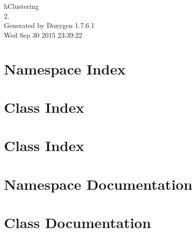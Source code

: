 \documentclass[a4paper]{book}
\begin{document}
\hypersetup{pageanchor=false,citecolor=blue}
\begin{titlepage}
\vspace*{7cm}
\begin{center}
{\Large h\-Clustering \\[1ex]\large 2. }\\
\vspace*{1cm}
{\large \-Generated by Doxygen 1.7.6.1}\\
\vspace*{0.5cm}
{\small Wed Sep 30 2015 23:39:22}\\
\end{center}
\end{titlepage}
\clearemptydoublepage
{}
\tableofcontents
\clearemptydoublepage
{}
\hypersetup{pageanchor=true,citecolor=blue}
\chapter{\-Namespace \-Index}

\chapter{\-Class \-Index}

\chapter{\-Class \-Index}

\chapter{\-Namespace \-Documentation}

\chapter{\-Class \-Documentation}

























\printindex
\end{document}
